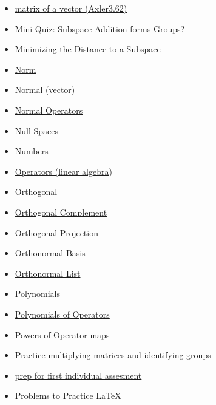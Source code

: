 \documentclass[11pt]{article}
\begin{document}
\begin{itemize}
\begin{itemize}
\begin{itemize}
\item \href{mathematics/linear\_algebra/KBrefMatrixOfVector.org}{matrix of a vector (Axler3.62)}
\item \href{mathematics/linear\_algebra/KBe20math530retMiniQuizSubspaceAdditionGroup.org}{Mini Quiz: Subspace Addition forms Groups?}
\item \href{mathematics/linear\_algebra/KBrefMinimizingDistanceToSubspace.org}{Minimizing the Distance to a Subspace}
\item \href{mathematics/linear\_algebra/KBrefNorm.org}{Norm}
\item \href{mathematics/linear\_algebra/KBrefNormal.org}{Normal (vector)}
\item \href{mathematics/linear\_algebra/KBrefNormalOperators.org}{Normal Operators}
\item \href{mathematics/linear\_algebra/KBrefNullSpace.org}{Null Spaces}
\item \href{mathematics/linear\_algebra/KBe2020math530floNumbers.org}{Numbers}
\item \href{mathematics/linear\_algebra/KBrefOperators.org}{Operators (linear algebra)}
\item \href{mathematics/linear\_algebra/KBrefOrthogonal.org}{Orthogonal}
\item \href{mathematics/linear\_algebra/KBrefOrthogonalComplement.org}{Orthogonal Complement}
\item \href{mathematics/linear\_algebra/KBrefOrthogonalProjection.org}{Orthogonal Projection}
\item \href{mathematics/linear\_algebra/KBrefOrthonormalBasis.org}{Orthonormal Basis}
\item \href{mathematics/linear\_algebra/KBrefOrthonormal.org}{Orthonormal List}
\item \href{mathematics/linear\_algebra/KBrefPolynomial.org}{Polynomials}
\item \href{mathematics/linear\_algebra/KBrefPolynomialOfOperators.org}{Polynomials of Operators}
\item \href{mathematics/linear\_algebra/KBrefOperatorExponents.org}{Powers of Operator maps}
\item \href{mathematics/linear\_algebra/KBe2020math530retPracticeMultiplyMatrixIdentfyGroups.org}{Practice multiplying matrices and identifying groups}
\item \href{mathematics/linear\_algebra/KBe20math530refIndividualAsssesment1.org}{prep for first individual assesment}
\item \href{mathematics/linear\_algebra/20math530retProblemsPracticeLaTeX.org}{Problems to Practice \LaTeX{}}

\end{itemize}
\end{itemize}
\end{itemize}
\end{document}
